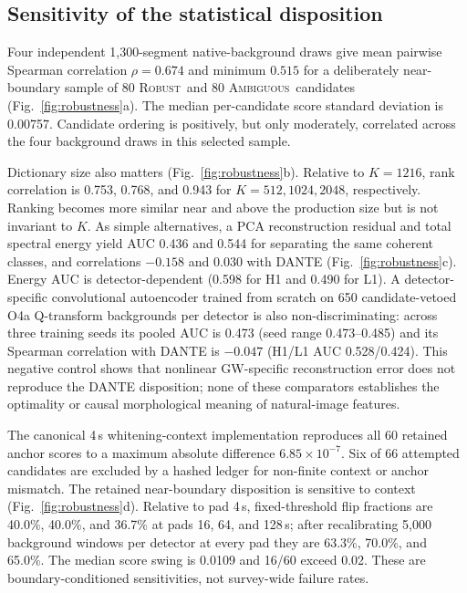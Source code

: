 \documentclass[aps,prd,twocolumn,superscriptaddress,nofootinbib,amsmath,amssymb,floatfix,10pt]{revtex4-2}
\newcommand{\robust}{\textsc{Robust}}
\newcommand{\ambiguous}{\textsc{Ambiguous}}
\begin{document}
\subsection{Sensitivity of the statistical disposition}

Four independent 1,300-segment native-background draws give mean pairwise
Spearman correlation $\rho=0.674$ and minimum $0.515$ for a deliberately
near-boundary sample of 80 \robust\ and 80 \ambiguous\ candidates
(Fig.~\ref{fig:robustness}a).  The median per-candidate score standard
deviation is 0.00757.  Candidate ordering is positively, but only moderately,
correlated across the four background draws in this selected sample.

Dictionary size also matters (Fig.~\ref{fig:robustness}b).  Relative to
$K=1216$, rank correlation is 0.753, 0.768, and 0.943 for
$K=512,1024,2048$, respectively.  Ranking becomes more similar near and above
the production size but is not invariant to $K$.  As simple alternatives, a
PCA reconstruction residual and total spectral energy yield AUC 0.436 and
0.544 for separating the same coherent classes, and correlations $-0.158$ and
$0.030$ with DANTE (Fig.~\ref{fig:robustness}c).  Energy AUC is
detector-dependent (0.598 for H1 and 0.490 for L1).  A detector-specific
convolutional autoencoder trained from scratch on 650 candidate-vetoed O4a
Q-transform backgrounds per detector is also non-discriminating: across three
training seeds its pooled AUC is 0.473 (seed range 0.473--0.485) and its
Spearman correlation with DANTE is $-0.047$ (H1/L1 AUC 0.528/0.424).
This negative control shows that nonlinear GW-specific reconstruction error
does not reproduce the DANTE disposition; none of these comparators
establishes the optimality or causal morphological meaning of natural-image
features.

The canonical 4\,s whitening-context implementation reproduces all 60 retained
anchor scores to a maximum absolute difference $6.85\times10^{-7}$.  Six of
66 attempted candidates are excluded by a hashed ledger for non-finite context
or anchor mismatch.  The retained near-boundary disposition is sensitive to
context (Fig.~\ref{fig:robustness}d).  Relative to pad 4\,s, fixed-threshold
flip fractions are 40.0\%, 40.0\%, and 36.7\% at pads 16, 64, and 128\,s;
after recalibrating 5,000 background windows per detector at every pad they are
63.3\%, 70.0\%, and 65.0\%. The median score swing is 0.0109 and 16/60 exceed
0.02. These are boundary-conditioned sensitivities, not
survey-wide failure rates.
\end{document}
